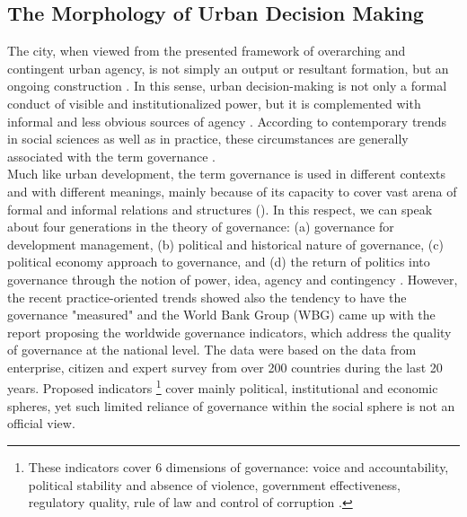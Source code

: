 \documentclass[11pt]{report}
\begin{document}
\subsection{The Morphology of Urban Decision Making}

The city, when viewed from the presented framework of overarching and contingent urban agency, is not simply an output or resultant formation,  but  an ongoing  construction \href{McFarlane}{\citealt{mcfarlane_assemblage_2011}}.
In this sense, urban decision-making is not only a formal conduct of visible and institutionalized power, but it is  complemented with informal and less obvious sources of agency \cite{(Lukes 1974 from Healey 1997)}.
According to contemporary trends in social sciences as well as in practice, these circumstances are generally associated with the term governance \href{Pierre}{\citealt{pierre_governance_2000}}.
\\

Much like urban development, the term governance is used in different contexts and with different meanings, mainly because of its capacity to cover vast arena of formal and informal relations and structures (\href{Pierre}{\citealt{pierre_governance_2000}}).
In this respect, we can speak about four generations in the theory of governance:
(a) governance for development management,
(b) political and historical nature of governance,
(c) political economy approach to governance,
and
(d) the return of politics into governance through the notion of power, idea, agency and contingency \href{Hudson}{\citealt{hudson_political_2014}}.
However, the recent practice-oriented trends showed also the tendency to have the governance "measured" and the World Bank Group (WBG) came up with the report proposing the worldwide governance indicators, which address the quality of governance at the national level.
The data were based on the data from enterprise, citizen and expert survey from over 200 countries during the last 20 years.
Proposed indicators
\footnote{These indicators cover 6 dimensions of governance: voice and accountability, political stability and absence of violence, government effectiveness, regulatory quality, rule of law and control of corruption \cite{WGI 2016}.}
cover mainly political, institutional and economic spheres, yet such limited reliance of governance within the social sphere is not an official view.
\\
\end{document}
